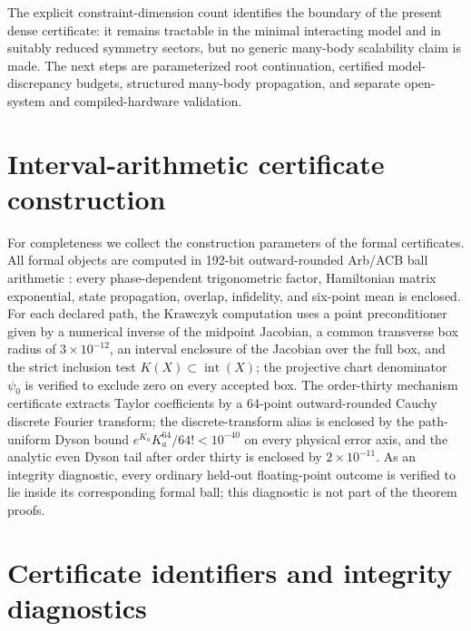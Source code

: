 \documentclass[11pt]{article}
\begin{document}
The explicit constraint-dimension count identifies the boundary of the
present dense certificate: it remains tractable in the minimal interacting
model and in suitably reduced symmetry sectors, but no generic many-body
scalability claim is made. The next steps are parameterized root
continuation, certified model-discrepancy budgets, structured many-body
propagation, and separate open-system and compiled-hardware validation.

\appendix

\section{Interval-arithmetic certificate construction}
\label{app:interval}

For completeness we collect the construction parameters of the formal
certificates. All formal objects are computed in 192-bit outward-rounded
Arb/ACB ball arithmetic \cite{Johansson2017}: every phase-dependent
trigonometric factor, Hamiltonian matrix exponential, state propagation,
overlap, infidelity, and six-point mean is enclosed. For each declared path,
the Krawczyk computation uses a point preconditioner given by a numerical
inverse of the midpoint Jacobian, a common transverse box radius of
$3\times10^{-12}$, an interval enclosure of the Jacobian over the full box,
and the strict inclusion test $K(X)\subset\operatorname{int}(X)$; the
projective chart denominator $\psi_0$ is verified to exclude zero on every
accepted box. The order-thirty mechanism certificate extracts Taylor
coefficients by a 64-point outward-rounded Cauchy discrete Fourier
transform; the discrete-transform alias is enclosed by the path-uniform
Dyson bound $e^{K_a}K_a^{64}/64!<10^{-40}$ on every physical error axis, and
the analytic even Dyson tail after order thirty is enclosed by
$2\times10^{-11}$. As an integrity diagnostic, every ordinary held-out
floating-point outcome is verified to lie inside its corresponding formal
ball; this diagnostic is not part of the theorem proofs.

\section{Certificate identifiers and integrity diagnostics}
\label{app:hashes}
\end{document}
